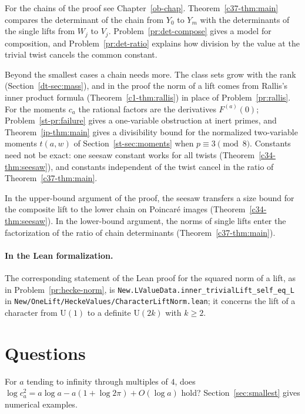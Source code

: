 \documentclass[reqno]{amsart}
\newcounter{chap}
\theoremstyle{definition}
\theoremstyle{plain}
\begin{document}
For the chains of the proof see Chapter~\ref{ob-chap}.  Theorem~\ref{c37-thm:main} compares the determinant of the chain from \(Y_0\) to \(Y_m\) with the determinants of the single lifts from \(W_j\) to \(V_j\).  Problem~\ref{pr:det-compose} gives a model for composition, and Problem~\ref{pr:det-ratio} explains how division by the value at the trivial twist cancels the common constant.

Beyond the smallest cases a chain needs more.  The class sets grow with the rank (Section~\ref{dt-sec:mass}), and in the proof the norm of a lift comes from Rallis's inner product formula (Theorem~\ref{c1-thm:rallis}) in place of Problem~\ref{pr:rallis}.  For the moments \(c_a\) the rational factors are the derivatives \(F^{(a)}(0)\); Problem~\ref{st-pr:failure} gives a one-variable obstruction at inert primes, and Theorem~\ref{ip-thm:main} gives a divisibility bound for the normalized two-variable moments \(t(a,w)\) of Section~\ref{st-sec:moments} when \(p \equiv 3 \pmod 8\).  Constants need not be exact: one seesaw constant works for all twists (Theorem~\ref{c34-thm:seesaw}), and constants independent of the twist cancel in the ratio of Theorem~\ref{c37-thm:main}.

In the upper-bound argument of the proof, the seesaw transfers a size bound for the composite lift to the lower chain on Poincar\'e images (Theorem~\ref{c34-thm:seesaw}).  In the lower-bound argument, the norms of single lifts enter the factorization of the ratio of chain determinants (Theorem~\ref{c37-thm:main}).

\paragraph{In the Lean formalization.}
The corresponding statement of the Lean proof \cite{GL} for the squared norm of a lift, as in Problem~\ref{pr:hecke-norm}, is \texttt{New.LValueData.inner\_trivialLift\_self\_eq\_L} in \texttt{New/OneLift/HeckeValues/CharacterLiftNorm.lean}; it concerns the lift of a character from \(\mathrm{U}(1)\) to a definite \(\mathrm{U}(2k)\) with \(k \ge 2\).

\section{Questions}\label{sec:questions}

For \(a\) tending to infinity through multiples of \(4\), does \(\log c_a^2 = a\log a - a(1 + \log 2\pi) + O(\log a)\) hold?  Section~\ref{sec:smallest} gives numerical examples.
\end{document}

